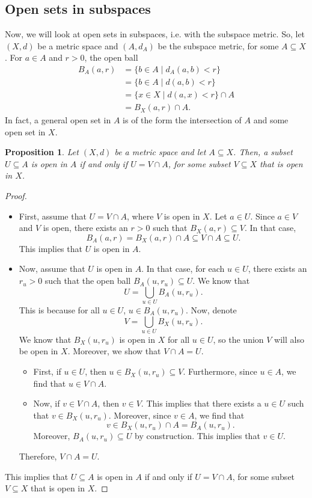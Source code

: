 \documentclass[a4paper, openany]{memoir}
\theoremstyle{definition}
\theoremstyle{plain}
\newtheorem{proposition}[definition]{Proposition}
\begin{document}
\subsection{Open sets in subspaces}
Now, we will look at open sets in subspaces, i.e. with the subspace metric. So, let $(X, d)$ be a metric space and $(A, d_A)$ be the subspace metric, for some $A \subseteq X$. For $a \in A$ and $r > 0$, the open ball
\begin{align*}
    B_A(a, r) &= \{b \in A \mid d_A(a, b) < r\} \\
    &= \{b \in A \mid d(a, b) < r\} \\
    &= \{x \in X \mid d(a, x) < r\} \cap A \\
    &= B_X(a, r) \cap A.
\end{align*}
In fact, a general open set in $A$ is of the form the intersection of $A$ and some open set in $X$.
\begin{proposition}
Let $(X, d)$ be a metric space and let $A \subseteq X$. Then, a subset $U \subseteq A$ is open in $A$ if and only if $U = V \cap A$, for some subset $V \subseteq X$ that is open in $X$.
\end{proposition}
\begin{proof}
\hspace*{0pt}
\begin{itemize}
    \item First, assume that $U = V \cap A$, where $V$ is open in $X$. Let $a \in U$. Since $a \in V$ and $V$ is open, there exists an $r > 0$ such that $B_X(a, r) \subseteq V$. In that case,
    \[B_A(a, r) = B_X(a, r) \cap A \subseteq V \cap A \subseteq U.\]
    This implies that $U$ is open in $A$.
    
    \item Now, assume that $U$ is open in $A$. In that case, for each $u \in U$, there exists an $r_u > 0$ such that the open ball $B_A(u, r_u) \subseteq U$. We know that
    \[U = \bigcup_{u \in U} B_A(u, r_u).\]
    This is because for all $u \in U$, $u \in B_A(u, r_u)$. Now, denote
    \[V = \bigcup_{u \in U} B_X(u, r_u).\]
    We know that $B_X(u, r_u)$ is open in $X$ for all $u \in U$, so the union $V$ will also be open in $X$. Moreover, we show that $V \cap A = U$.
    \begin{itemize}
        \item First, if $u \in U$, then $u \in B_X(u, r_u) \subseteq V$. Furthermore, since $u \in A$, we find that $u \in V \cap A$.
        
        \item Now, if $v \in V \cap A$, then $v \in V$. This implies that there exists a $u \in U$ such that $v \in B_X(u, r_u)$. Moreover, since $v \in A$, we find that
        \[v \in B_X(u, r_u) \cap A = B_A(u, r_u).\]
        Moreover, $B_A(u, r_u) \subseteq U$ by construction. This implies that $v \in U$.
    \end{itemize}
    Therefore, $V \cap A = U$.
\end{itemize}
This implies that $U \subseteq A$ is open in $A$ if and only if $U = V \cap A$, for some subset $V \subseteq X$ that is open in $X$.
\end{proof}
\end{document}
